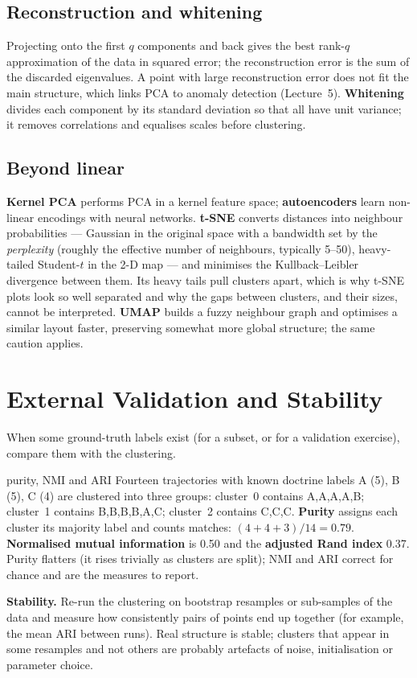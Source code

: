 \documentclass[11pt]{article}
\begin{document}
\subsection{Reconstruction and whitening}
Projecting onto the first $q$ components and back gives the best rank-$q$ approximation of the data in squared error; the reconstruction error is the sum of the discarded eigenvalues. A point with large reconstruction error does not fit the main structure, which links PCA to anomaly detection (Lecture~5). \textbf{Whitening} divides each component by its standard deviation so that all have unit variance; it removes correlations and equalises scales before clustering.
\subsection{Beyond linear}
\textbf{Kernel PCA} performs PCA in a kernel feature space; \textbf{autoencoders} learn non-linear encodings with neural networks. \textbf{t-SNE} converts distances into neighbour probabilities --- Gaussian in the original space with a bandwidth set by the \emph{perplexity} (roughly the effective number of neighbours, typically 5--50), heavy-tailed Student-$t$ in the 2-D map --- and minimises the Kullback--Leibler divergence between them. Its heavy tails pull clusters apart, which is why t-SNE plots look so well separated and why the gaps between clusters, and their sizes, cannot be interpreted. \textbf{UMAP} builds a fuzzy neighbour graph and optimises a similar layout faster, preserving somewhat more global structure; the same caution applies.

\section{External Validation and Stability}
When some ground-truth labels exist (for a subset, or for a validation exercise), compare them with the clustering.
\begin{example}{purity, NMI and ARI}
Fourteen trajectories with known doctrine labels A (5), B (5), C (4) are clustered into three groups: cluster~0 contains A,A,A,A,B; cluster~1 contains B,B,B,B,A,C; cluster~2 contains C,C,C. \textbf{Purity} assigns each cluster its majority label and counts matches: $(4+4+3)/14=0.79$. \textbf{Normalised mutual information} is 0.50 and the \textbf{adjusted Rand index} 0.37. Purity flatters (it rises trivially as clusters are split); NMI and ARI correct for chance and are the measures to report.
\end{example}
\textbf{Stability.} Re-run the clustering on bootstrap resamples or sub-samples of the data and measure how consistently pairs of points end up together (for example, the mean ARI between runs). Real structure is stable; clusters that appear in some resamples and not others are probably artefacts of noise, initialisation or parameter choice.
\end{document}
